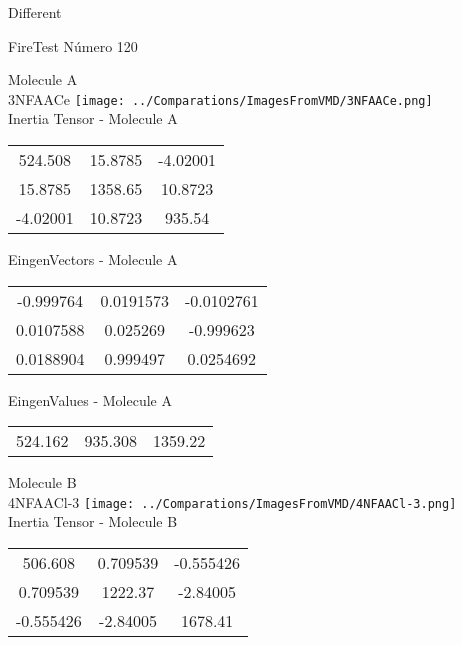 \begin{center}
\vtab
\vtab
\textcolor{NavyBlue}{\Large Different}
\end{center}

 \newpage

\vtab[-2cm]
\begin{center}
{\large FireTest \tab Número 120}
\end{center}
\begin{multicols}{2}
\begin{center}

Molecule A \\ 
3NFAACe
\texttt{[image: ../Comparations/ImagesFromVMD/3NFAACe.png]}
\\
Inertia Tensor - Molecule A \\
\vtab

\begin{tabular}{|c c c|}
524.508	 & 	15.8785	 & 	-4.02001	 \\
15.8785	 & 	1358.65	 & 	10.8723	 \\
-4.02001	 & 	10.8723	 & 	935.54
\end{tabular}

\vtab
 EingenVectors - Molecule A     \\
\vtab
\begin{tabular}{|c c c|}
-0.999764	 & 	0.0191573	 & 	-0.0102761	 \\
0.0107588	 & 	0.025269	 & 	-0.999623	 \\
0.0188904	 & 	0.999497	 & 	0.0254692
\end{tabular}

\vtab
 EingenValues - Molecule A     \\
\vtab
\begin{tabular}{|c c c|}
524.162	 & 	935.308	 & 	1359.22	 \\
\end{tabular}
\columnbreak

Molecule B \\ 
4NFAACl-3
\texttt{[image: ../Comparations/ImagesFromVMD/4NFAACl-3.png]}
\\
Inertia Tensor - Molecule B \\
\vtab

\begin{tabular}{|c c c|}
506.608	 & 	0.709539	 & 	-0.555426	 \\
0.709539	 & 	1222.37	 & 	-2.84005	 \\
-0.555426	 & 	-2.84005	 & 	1678.41
\end{tabular}


\end{center}
\end{multicols}
